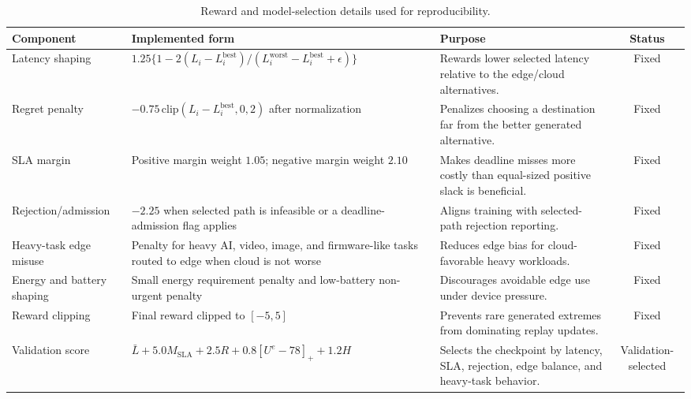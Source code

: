 \begin{table}[!t]
\centering
\caption{Reward and model-selection details used for reproducibility.}
\label{tab:reward_reproducibility}
\scriptsize
\begin{tabularx}{\textwidth}{@{}lXXc@{}}
\toprule
Component & Implemented form & Purpose & Status \\
\midrule
Latency shaping & $1.25\{1-2(L_i-L_i^{\mathrm{best}})/(L_i^{\mathrm{worst}}-L_i^{\mathrm{best}}+\epsilon)\}$ & Rewards lower selected latency relative to the edge/cloud alternatives. & Fixed \\
Regret penalty & $-0.75\,\mathrm{clip}(L_i-L_i^{\mathrm{best}},0,2)$ after normalization & Penalizes choosing a destination far from the better generated alternative. & Fixed \\
SLA margin & Positive margin weight $1.05$; negative margin weight $2.10$ & Makes deadline misses more costly than equal-sized positive slack is beneficial. & Fixed \\
Rejection/admission & $-2.25$ when selected path is infeasible or a deadline-admission flag applies & Aligns training with selected-path rejection reporting. & Fixed \\
Heavy-task edge misuse & Penalty for heavy AI, video, image, and firmware-like tasks routed to edge when cloud is not worse & Reduces edge bias for cloud-favorable heavy workloads. & Fixed \\
Energy and battery shaping & Small energy requirement penalty and low-battery non-urgent penalty & Discourages avoidable edge use under device pressure. & Fixed \\
Reward clipping & Final reward clipped to $[-5,5]$ & Prevents rare generated extremes from dominating replay updates. & Fixed \\
Validation score & $\bar{L}+5.0M_{\mathrm{SLA}}+2.5R+0.8[U^e-78]_+ +1.2H$ & Selects the checkpoint by latency, SLA, rejection, edge balance, and heavy-task behavior. & Validation-selected \\
\bottomrule
\end{tabularx}
\end{table}
